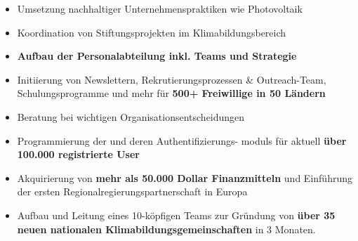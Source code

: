 \documentclass[10pt,a4paper,ragged2e,withhyper]{altacv}
\begin{document}
\begin{paracol}{2}


\begin{itemize}
    \item Umsetzung nachhaltiger Unternehmenspraktiken wie Photovoltaik
    \item Koordination von Stiftungsprojekten im Klimabildungsbereich
\end{itemize}

\medskip\medskip

\begin{itemize}
    \item \textbf{Aufbau der Personalabteilung inkl. Teams und  Strategie}
    \item Initiierung von Newslettern, Rekrutierungsprozessen \& Outreach-Team, Schulungsprogramme und mehr für \textbf{500+ Freiwillige in 50 Ländern}
    \item Beratung bei wichtigen Organisationsentscheidungen
\end{itemize}

\medskip\medskip

\begin{itemize}
    \item Programmierung der  und deren Authentifizierungs- moduls für aktuell \textbf{über 100.000 registrierte User}
    \item Akquirierung von \textbf{mehr als 50.000 Dollar Finanzmitteln} und Einführung der ersten Regionalregierungspartnerschaft in Europa
    \item Aufbau und Leitung eines 10-köpfigen Teams zur Gründung von \textbf{über 35 neuen nationalen Klimabildungsgemeinschaften} in 3 Monaten.
\end{itemize}
 


\end{paracol}
\end{document}
